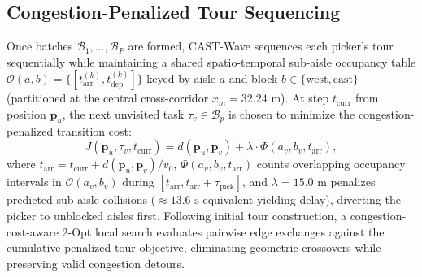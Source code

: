 \documentclass[conference]{IEEEtran}
\begin{document}
\subsection{Congestion-Penalized Tour Sequencing}
\label{sec:congestion_routing}
Once batches $\mathcal{B}_1, \dots, \mathcal{B}_P$ are formed, CAST-Wave sequences each picker's tour sequentially while maintaining a shared spatio-temporal sub-aisle occupancy table $\mathcal{O}(a, b) = \{[t_{\text{arr}}^{(k)}, t_{\text{dep}}^{(k)}]\}$ keyed by aisle $a$ and block $b \in \{\text{west}, \text{east}\}$ (partitioned at the central cross-corridor $x_m = 32.24\text{ m}$). At step $t_{\text{curr}}$ from position $\mathbf{p}_u$, the next unvisited task $\tau_v \in \mathcal{B}_p$ is chosen to minimize the congestion-penalized transition cost:
\begin{equation}
\label{eq:cast_cost}
J(\mathbf{p}_u, \tau_v, t_{\text{curr}}) = d(\mathbf{p}_u, \mathbf{p}_v) + \lambda \cdot \Phi(a_v, b_v, t_{\text{arr}}),
\end{equation}
where $t_{\text{arr}} = t_{\text{curr}} + d(\mathbf{p}_u, \mathbf{p}_v)/v_0$, $\Phi(a_v, b_v, t_{\text{arr}})$ counts overlapping occupancy intervals in $\mathcal{O}(a_v, b_v)$ during $[t_{\text{arr}}, t_{\text{arr}} + \tau_{\text{pick}}]$, and $\lambda = 15.0\text{ m}$ penalizes predicted sub-aisle collisions ($\approx 13.6\text{ s}$ equivalent yielding delay), diverting the picker to unblocked aisles first. Following initial tour construction, a congestion-cost-aware 2-Opt local search evaluates pairwise edge exchanges against the cumulative penalized tour objective, eliminating geometric crossovers while preserving valid congestion detours.
\end{document}
